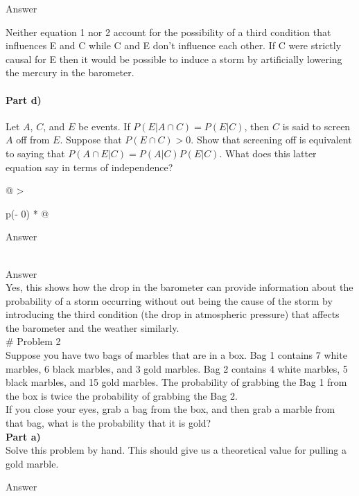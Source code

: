 \documentclass[
  letterpaper,
  DIV=11,
  numbers=noendperiod]{scrartcl}
\let\oldparagraph\paragraph
\renewcommand{\paragraph}[1]{\oldparagraph{#1}\mbox{}}
\begin{document}
Answer

Neither equation 1 nor 2 account for the possibility of a third
condition that influences E and C while C and E don't influence each
other. If C were strictly causal for E then it would be possible to
induce a storm by artificially lowering the mercury in the barometer.

\paragraph{Part d)}\label{part-d}

Let \(A\), \(C\), and \(E\) be events. If
\(P(E | A \cap C) = P(E |C )\), then \(C\) is said to screen \(A\) off
from \(E\). Suppose that \(P (E \cap C) > 0.\) Show that screening off
is equivalent to saying that \(P(A \cap E | C)=P(A|C)P(E | C).\) What
does this latter equation say in terms of independence?

\begin{longtable}[]{@{}
  >{\raggedright\arraybackslash}p{(\columnwidth - 0\tabcolsep) * }@{}}
\toprule\noalign{}
\begin{minipage}[b]{\linewidth}\raggedright
Answer
\end{minipage} \\
\midrule\noalign{}
\endhead
\bottomrule\noalign{}
\endlastfoot
Answer \\
Yes, this shows how the drop in the barometer can provide information
about the probability of a storm occurring without out being the cause
of the storm by introducing the third condition (the drop in atmospheric
pressure) that affects the barometer and the weather similarly. \\
\# Problem 2 \\
Suppose you have two bags of marbles that are in a box. Bag 1 contains 7
white marbles, 6 black marbles, and 3 gold marbles. Bag 2 contains 4
white marbles, 5 black marbles, and 15 gold marbles. The probability of
grabbing the Bag 1 from the box is twice the probability of grabbing the
Bag 2. \\
If you close your eyes, grab a bag from the box, and then grab a marble
from that bag, what is the probability that it is gold? \\
\textbf{Part a)} \\
Solve this problem by hand. This should give us a theoretical value for
pulling a gold marble. \\
\end{longtable}

Answer
\end{document}
